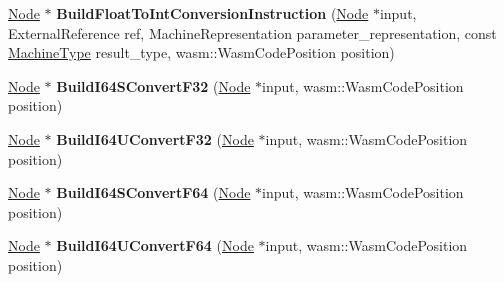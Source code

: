 \begin{DoxyCompactItemize}
\item 
\hyperlink{classv8_1_1internal_1_1compiler_1_1_node}{Node} $\ast$ {\bfseries Build\+Float\+To\+Int\+Conversion\+Instruction} (\hyperlink{classv8_1_1internal_1_1compiler_1_1_node}{Node} $\ast$input, External\+Reference ref, Machine\+Representation parameter\+\_\+representation, const \hyperlink{classv8_1_1internal_1_1_machine_type}{Machine\+Type} result\+\_\+type, wasm\+::\+Wasm\+Code\+Position position)\hypertarget{classv8_1_1internal_1_1compiler_1_1_wasm_graph_builder_adcb491892628e9d75e4ddd1c77774924}{}\label{classv8_1_1internal_1_1compiler_1_1_wasm_graph_builder_adcb491892628e9d75e4ddd1c77774924}

\item 
\hyperlink{classv8_1_1internal_1_1compiler_1_1_node}{Node} $\ast$ {\bfseries Build\+I64\+S\+Convert\+F32} (\hyperlink{classv8_1_1internal_1_1compiler_1_1_node}{Node} $\ast$input, wasm\+::\+Wasm\+Code\+Position position)\hypertarget{classv8_1_1internal_1_1compiler_1_1_wasm_graph_builder_afb5eeca16b308dd8c870a0dd36ae5636}{}\label{classv8_1_1internal_1_1compiler_1_1_wasm_graph_builder_afb5eeca16b308dd8c870a0dd36ae5636}

\item 
\hyperlink{classv8_1_1internal_1_1compiler_1_1_node}{Node} $\ast$ {\bfseries Build\+I64\+U\+Convert\+F32} (\hyperlink{classv8_1_1internal_1_1compiler_1_1_node}{Node} $\ast$input, wasm\+::\+Wasm\+Code\+Position position)\hypertarget{classv8_1_1internal_1_1compiler_1_1_wasm_graph_builder_a5a5220117fb2fd703e985051917873a8}{}\label{classv8_1_1internal_1_1compiler_1_1_wasm_graph_builder_a5a5220117fb2fd703e985051917873a8}

\item 
\hyperlink{classv8_1_1internal_1_1compiler_1_1_node}{Node} $\ast$ {\bfseries Build\+I64\+S\+Convert\+F64} (\hyperlink{classv8_1_1internal_1_1compiler_1_1_node}{Node} $\ast$input, wasm\+::\+Wasm\+Code\+Position position)\hypertarget{classv8_1_1internal_1_1compiler_1_1_wasm_graph_builder_aa4f9dcf225fa0df38758cdb5ae8ca344}{}\label{classv8_1_1internal_1_1compiler_1_1_wasm_graph_builder_aa4f9dcf225fa0df38758cdb5ae8ca344}

\item 
\hyperlink{classv8_1_1internal_1_1compiler_1_1_node}{Node} $\ast$ {\bfseries Build\+I64\+U\+Convert\+F64} (\hyperlink{classv8_1_1internal_1_1compiler_1_1_node}{Node} $\ast$input, wasm\+::\+Wasm\+Code\+Position position)\hypertarget{classv8_1_1internal_1_1compiler_1_1_wasm_graph_builder_a17acc8192111628b639055a6a8a2f155}{}\label{classv8_1_1internal_1_1compiler_1_1_wasm_graph_builder_a17acc8192111628b639055a6a8a2f155}


\end{DoxyCompactItemize}

